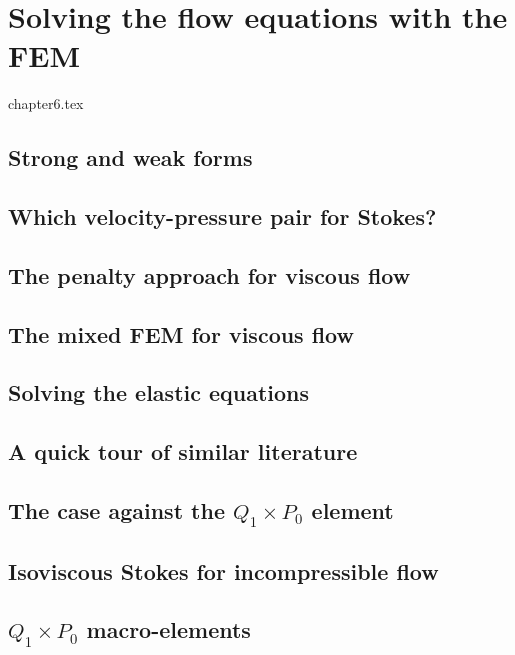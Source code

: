 \chapter{Solving the flow equations with the FEM} \label{solvingFEM} %

\begin{flushright} {\tiny {\color{gray} chapter6.tex}} \end{flushright}

\section{Strong and weak forms}  %
\section{Which velocity-pressure pair for Stokes?}\label{ss:pair} %

\newpage
\section{The penalty approach for viscous flow}\label{sec:penalty} %
\section{The mixed FEM for viscous flow} \label{sec:mixed}  %
\section{Solving the elastic equations}  %
\section{A quick tour of similar literature}  %
\section{The case against the $Q_1\times P_0$ element}  %
\section{Isoviscous Stokes for incompressible flow}\label{ss:isovisc} 
\section{$Q_1\times P_0$ macro-elements} \label{ss:meshtopos}  %
